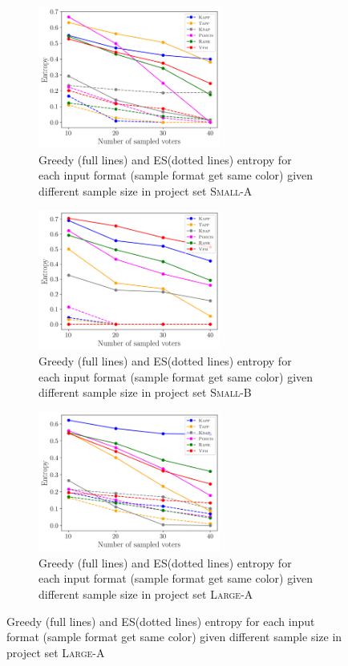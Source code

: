 \documentclass{comsoc2023}
\newcommand{\mes}{ES}
\begin{document}
\begin{figure}[!h]
     \centering
          \begin{subfigure}[b]{0.45\textwidth}
         \centering
        \includegraphics[width=6cm]{experiment/entropy_small_a.png}
\caption{Greedy (full lines) and \mes (dotted lines) entropy  for each input format (sample format get same color) given different sample size in project set \textsc{Small-A} }\label{fig:entropy_sa}
     \end{subfigure}\hfill
     \begin{subfigure}[b]{0.45\textwidth}
         \centering
         \includegraphics[width=6cm]{experiment/entropy_small_b.png}
\caption{Greedy (full lines) and \mes (dotted lines) entropy  for each input format (sample format get same color) given different sample size in project set \textsc{Small-B}}\label{fig:entropy_sb}
     \end{subfigure}
     \hfill
     \begin{subfigure}[b]{0.45\textwidth}
         \centering
         \includegraphics[width=6cm]{experiment/entropy_large_a.png}
\caption{Greedy (full lines) and \mes (dotted lines) entropy  for each input format (sample format get same color) given different sample size in project set \textsc{Large-A} }\label{fig:entropy_la}

\end{subfigure}
\end{figure}
\end{document}
